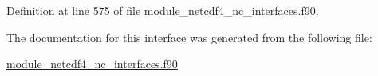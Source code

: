 Definition at line 575 of file module\+\_\+netcdf4\+\_\+nc\+\_\+interfaces.\+f90.



The documentation for this interface was generated from the following file\+:\begin{DoxyCompactItemize}
\item 
\hyperlink{module__netcdf4__nc__interfaces_8f90}{module\+\_\+netcdf4\+\_\+nc\+\_\+interfaces.\+f90}\end{DoxyCompactItemize}

